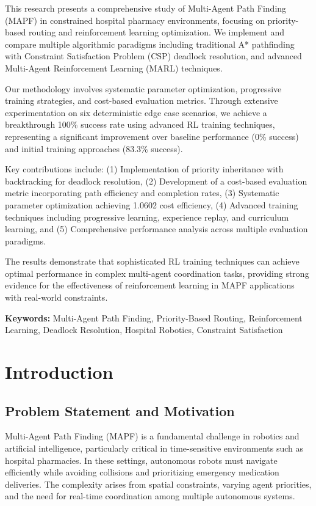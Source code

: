 \documentclass[12pt, a4paper]{report}
\begin{document}
This research presents a comprehensive study of Multi-Agent Path Finding (MAPF) in constrained hospital pharmacy environments, focusing on priority-based routing and reinforcement learning optimization. We implement and compare multiple algorithmic paradigms including traditional A* pathfinding with Constraint Satisfaction Problem (CSP) deadlock resolution, and advanced Multi-Agent Reinforcement Learning (MARL) techniques.

Our methodology involves systematic parameter optimization, progressive training strategies, and cost-based evaluation metrics. Through extensive experimentation on six deterministic edge case scenarios, we achieve a breakthrough 100\% success rate using advanced RL training techniques, representing a significant improvement over baseline performance (0\% success) and initial training approaches (83.3\% success).

Key contributions include: (1) Implementation of priority inheritance with backtracking for deadlock resolution, (2) Development of a cost-based evaluation metric incorporating path efficiency and completion rates, (3) Systematic parameter optimization achieving 1.0602 cost efficiency, (4) Advanced training techniques including progressive learning, experience replay, and curriculum learning, and (5) Comprehensive performance analysis across multiple evaluation paradigms.

The results demonstrate that sophisticated RL training techniques can achieve optimal performance in complex multi-agent coordination tasks, providing strong evidence for the effectiveness of reinforcement learning in MAPF applications with real-world constraints.

\textbf{Keywords:} Multi-Agent Path Finding, Priority-Based Routing, Reinforcement Learning, Deadlock Resolution, Hospital Robotics, Constraint Satisfaction

\newpage

\chapter{Introduction}

\section{Problem Statement and Motivation}

Multi-Agent Path Finding (MAPF) is a fundamental challenge in robotics and artificial intelligence, particularly critical in time-sensitive environments such as hospital pharmacies. In these settings, autonomous robots must navigate efficiently while avoiding collisions and prioritizing emergency medication deliveries. The complexity arises from spatial constraints, varying agent priorities, and the need for real-time coordination among multiple autonomous systems.
\end{document}
